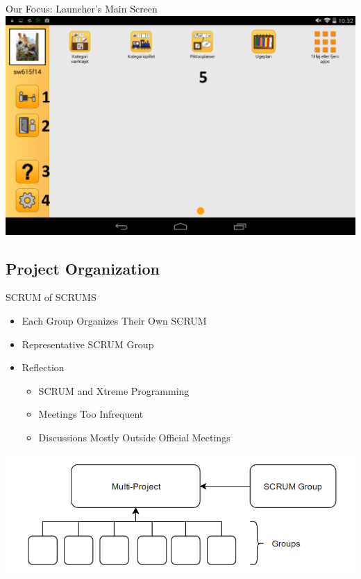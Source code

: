 \begin{frame}{Our Focus: Launcher's Main Screen}
\includegraphics[scale=0.28]{figures/MenuGuardian.png}
\end{frame}

\subsection{Project Organization}
\begin{frame}{SCRUM of SCRUMS}
\begin{itemize} 
	\item Each Group Organizes Their Own SCRUM
	\item Representative SCRUM Group
	\item Reflection
		\begin{itemize}
		    \item SCRUM and Xtreme Programming
		    \item Meetings Too Infrequent
		    \item Discussions Mostly Outside Official Meetings
		\end{itemize}
\end{itemize}
\includegraphics[scale=0.42]{figures/SoS.png} 
\end{frame}

